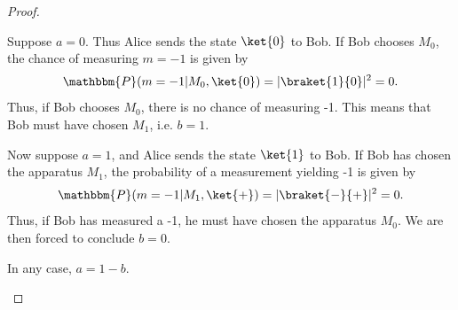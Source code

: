 \begin{proof}
	\begin{parts}
	\item Suppose $a=0$. Thus Alice sends the state $\ket{0}$ to Bob. If Bob chooses $M_0$, the chance of measuring $m=-1$ is given by
		\[
			\mathbbm{P}(m=-1|M_0,\ket{0})=|\braket{1}{0}|^2=0
		.\] 
		Thus, if Bob chooses $M_0$, there is no chance of measuring -1. This means that Bob must have chosen $M_1$, i.e. $b=1$.

		Now suppose $a=1$, and Alice sends the state $\ket{1}$ to Bob. If Bob has chosen the apparatus $M_1$, the probability of a measurement yielding -1 is given by
		\[
			\mathbbm{P}(m=-1|M_1,\ket{+})=|\braket{-}{+}|^2=0
		.\] 
		Thus, if Bob has measured a -1, he must have chosen the apparatus $M_0$. We are then forced to conclude $b=0$.

		In any case, $a=1-b$.


\end{parts}
\end{proof}
